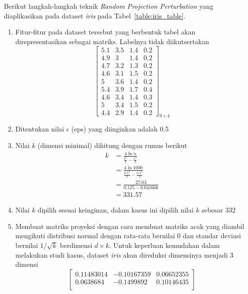 Berikut langkah-langkah teknik \textit{Random Projection Perturbation} yang diaplikasikan pada dataset \textit{iris} pada Tabel~\ref{table:iris_table}.
\begin{enumerate}
    \item Fitur-fitur pada dataset tersebut yang berbentuk tabel akan direpresentasikan sebagai matriks. Labelnya tidak diikutsertakan
    \[
        \begin{bmatrix}
        5.1		&		3.5		&		1.4		&		0.2	\\
        4.9		&		3		&		1.4		&		0.2	\\
        4.7		&		3.2		&		1.3		&		0.2	\\
        4.6		&		3.1		&		1.5		&		0.2	\\
        5		&		3.6		&		1.4		&		0.2	\\
        5.4		&		3.9		&		1.7		&		0.4	\\
        4.6		&		3.4		&		1.4		&		0.3	\\
        5		&		3.4		&		1.5		&		0.2	\\
        4.4		&		2.9		&		1.4		&		0.2 
        \end{bmatrix}_{9\times 4}
    \]
    \item Ditentukan nilai \(\epsilon\) (eps) yang diinginkan adalah 0.5
    \item Nilai \(k\) (dimensi minimal) dihitung dengan rumus berikut
    \begin{align*}
        k &= \frac{4\ln{n}}{\frac{\epsilon^{2}}{2}-\frac{\epsilon^{3}}{3}} \\
        &= \frac{4\ln{1000}}{\frac{0.5^{2}}{2}-\frac{0.5^{3}}{3}} \\
        &= \frac{27.63}{0.125-0.041666} \\
        &= 331.57
    \end{align*}
    \item Nilai \(k\) dipilih sesuai keinginan, dalam kasus ini dipilih nilai \(k\) sebesar 332
    \item Membuat matriks proyeksi dengan cara membuat matriks acak yang diambil mengikuti distribusi normal dengan rata-rata bernilai 0 dan standar deviasi bernilai \(1/\sqrt{k}\) berdimensi \(d \times k\). Untuk keperluan kemudahan dalam melakukan studi kasus, dataset \textit{iris} akan direduksi dimensinya menjadi 3 dimensi
    \[
        \begin{bmatrix}
        0.11483014 &  -0.10167359  &  0.06652355 \\
        0.0638684 &   -0.1499892   &  0.10146435 \\

\end{bmatrix}\]
\end{enumerate}
